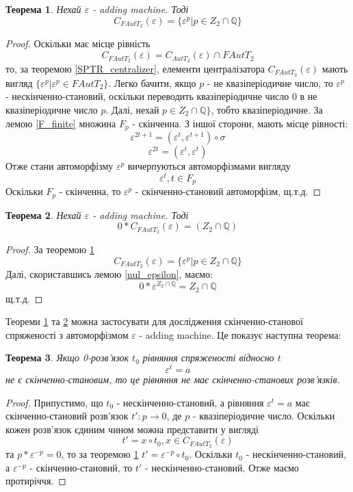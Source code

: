 \documentclass[a4paper,12pt]{article} \usepackage{a4wide}
\numberwithin{equation}{subsection}
\newtheorem{theorem}{Теорема}[subsection]
\begin{document}
 
\begin{theorem}\label{adding_machine_fs_centralizer}
  Нехай $\varepsilon$ - adding machine. Тоді
 $$C_{FAutT_2}(\varepsilon)=\{\varepsilon^p|p\in Z_2 \cap \mathbb{Q}\} $$ 
\end{theorem}
\begin{proof}
  Оскільки має місце рівність
$$C_{FAutT_2}(\varepsilon)=C_{AutT_2}(\varepsilon)\cap FAutT_2$$
то, за теоремою \ref{SPTR_centralizer}, елементи централізатора
$C_{FAutT_2}(\varepsilon)$ мають вигляд
$\{\varepsilon^p|\varepsilon^p\in FAutT_2\}$. Легко бачити, якщо $p$ -
не квазіперіодичне число, то $\varepsilon^p$ - нескінченно-становий,
оскільки переводить квазіперіодичне число 0 в не квазіперіодичне число
$p$.  Далі, нехай $p\in Z_2 \cap \mathbb{Q}\}$, тобто
квазіперіодичне. За лемою \ref{F_finite} множина $F_p$ - скінченна. З
іншої сторони, мають місце рівності:
$$\varepsilon^{2t+1} = (\varepsilon^t,\varepsilon^{t+1})\circ \sigma$$
$$\varepsilon^{2t} = (\varepsilon^t,\varepsilon^t)$$
Отже стани автоморфізму $\varepsilon^{p}$ вичерпуються автоморфізмами
вигляду $$\varepsilon^t, t\in F_p$$ Оскільки $F_p$ - скінченна, то
$\varepsilon^{p}$ - скінченно-становий автоморфізм, щ.т.д.
\end{proof}

\begin{theorem} \label{adding_machine_fs_orbite} Нехай $\varepsilon$ -
  adding machine. Тоді
 $$0*C_{FAutT_2}(\varepsilon)=(Z_2 \cap \mathbb{Q})$$
\end{theorem}
\begin{proof}
  За теоремою
  \ref{adding_machine_fs_centralizer} $$C_{FAutT_2}(\varepsilon)=\{\varepsilon^p|p\in
  Z_2 \cap \mathbb{Q}\}$$ Далі, скориставшись лемою \ref{nul_epsilon},
  маємо: $$0*\varepsilon^{Z_2 \cap \mathbb{Q}}=Z_2 \cap \mathbb{Q}$$
  щ.т.д.
\end{proof}

Теореми \ref{adding_machine_fs_centralizer} та
\ref{adding_machine_fs_orbite} можна застосувати для дослідження
скінченно-станової спряженості з автоморфізмом $\varepsilon$ - adding
machine. Це показує наступна теорема:

\begin{theorem}
  Якщо 0-розв'язок $t_0$ рівняння спряженості відносно $t$
 $$\varepsilon^t=a$$
 не є скінченно-становим, то це рівняння не має скінченно-станових
 розв'язків.
\end{theorem}
\begin{proof}
  Припустимо, що $t_0$ - нескінченно-становий, а рівняння
  $\varepsilon^t=a$ має скінченно-становий розв'язок $t':p\rightarrow
  0$, де $p$ - квазіперіодичне число. Оскільки кожен розв'язок єдиним
  чином можна представити у вигляді $$t' = x\circ t_0, x \in
  C_{FAutT_2}(\varepsilon)$$ та $p*\varepsilon^{-p}= 0$, то за
  теоремою \ref{adding_machine_fs_centralizer} $t' =
  \varepsilon^{-p}\circ t_0 $. Оскільки $t_0$ - нескінченно-становий,
  а $\varepsilon^{-p}$ - скінченно-становий, то $t'$ -
  нескінченно-становий. Отже маємо протиріччя.
\end{proof}
\end{document}
